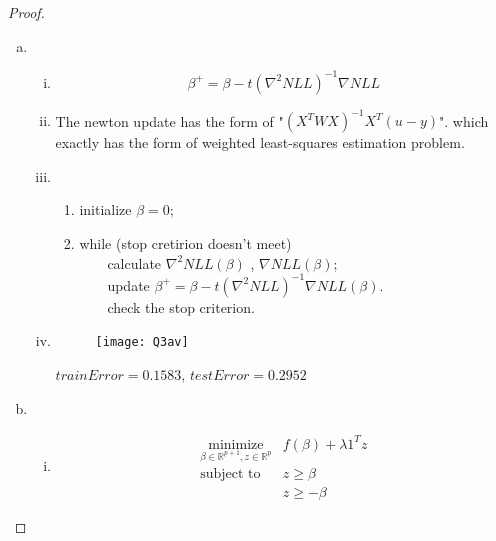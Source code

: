 \documentclass{article}
\theoremstyle{remark}
\theoremstyle{definition}
\newcommand{\minimize}{\mathop{\mathrm{minimize}}}
\newcommand{\minimizewrt}[1]{\underset{#1}{\minimize}}
\newcommand{\subjectto}{\mbox{subject to}}
\begin{document}
\begin{proof}
\begin{enumerate}[(a)]

    \item 
    \begin{enumerate}[(i)]Let $u=(u_1,\cdots,u_n)^T$, where $u_i=\frac{\exp(x_i^T \beta)}{1+\exp(x_i^T\beta)}$ 
    \[\nabla NLL=-X^Ty+\sum_{i=1}^n \frac{\exp(x_i^T \beta)}{1+\exp(x_i^T\beta)}x_i=X^T(u-y)\]
    \[\nabla^2 NLL= X^T\begin{bmatrix}
    u_i(1-u_i)& & \\
    & \ddots & \\
    & & u_n(1-u_n)
    \end{bmatrix}X=X^Tdiag(u)diag(1-u)X\]
    
    \item \[\beta^+ = \beta- t(\nabla^2 NLL)^{-1}\nabla NLL\]
    
    \item  The newton update has the form of "$(X^TWX)^{-1}X^T(u-y)$". which exactly has the form of weighted least-squares estimation problem.
    \item \begin{enumerate}[1.]
        \item initialize $\beta=0$;
        \item while (stop cretirion doesn't  meet)\\
        ~~~~calculate $\nabla^2 NLL(\beta)$ , $\nabla NLL(\beta)$;\\
        ~~~~update $\beta^+ = \beta-t (\nabla^2 NLL)^{-1}\nabla NLL(\beta)$.\\
        ~~~~check the stop criterion.
    \end{enumerate}
    \item 

\begin{figure}[H]
  \centering
\texttt{[image: Q3av]}
  \caption[]
   {}
\end{figure}
$trainError=0.1583$, $testError=0.2952$
    \end{enumerate}
\item 
\begin{enumerate}[(i)]
    \item \begin{equation*}
    \begin{array}{cc}
    \minimizewrt{ \beta \in \mathbb{R}^{p+1}, z\in \mathbb{R}^p } & 
    f(\beta)+\lambda 1^Tz\\
    \subjectto  &   z\geq \beta \\
    & z\geq -\beta
    \end{array}
    \end{equation*}
    

\end{enumerate}
\end{enumerate}
\end{proof}
\end{document}
